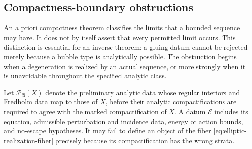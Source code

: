 \documentclass[11pt,letterpaper,twoside]{article}
\theoremstyle{plain}
\theoremstyle{definition}
\theoremstyle{remark}
\begin{document}
\subsection{Compactness-boundary obstructions}

An a priori compactness theorem classifies the limits that a bounded sequence may have.  It does not by itself assert that every permitted limit occurs.  This distinction is essential for an inverse theorem: a gluing datum cannot be rejected merely because a bubble type is analytically possible.  The obstruction begins when a degeneration is realized by an actual sequence, or more strongly when it is unavoidable throughout the specified analytic class.

Let $\mathcal P_{\mathfrak A}(X)$ denote the preliminary analytic data whose regular interiors and Fredholm data map to those of $X$, before their analytic compactifications are required to agree with the marked compactification of $X$.  A datum $\mathcal E$ includes its equation, admissible perturbation and incidence data, energy or action bounds, and no-escape hypotheses.  It may fail to define an object of the fiber \eqref{eq:elliptic-realization-fiber} precisely because its compactification has the wrong strata.
\end{document}
